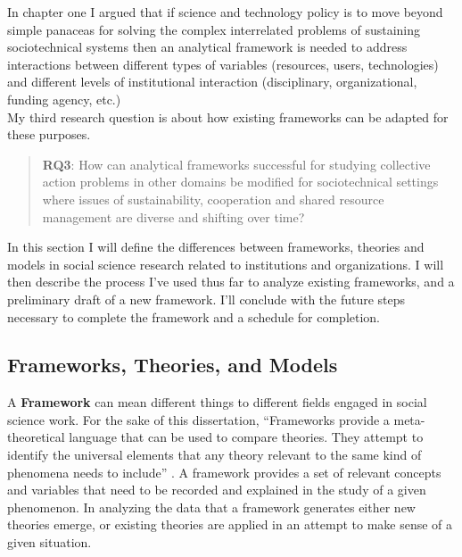 \documentclass[thesis,tocnosub,noragright,centerchapter,12pt]{uiucecethesis09}
\begin{document}
{In chapter one I argued that if science and
technology policy is to move beyond simple panaceas for solving the
complex interrelated problems of sustaining sociotechnical systems then
an analytical framework is needed to address interactions
between different types of variables (resources, users, technologies)
and different levels of institutional interaction (disciplinary,
organizational, funding agency, etc.)\\

My third research question is about how
existing frameworks can be adapted for these purposes.\\

\begin{quote}
\textbf{RQ3}: How can analytical frameworks successful for studying
collective action problems in other domains be modified for
sociotechnical settings where issues of sustainability, cooperation and
shared resource management are diverse and shifting over time?
\end{quote}

In this section I will define the differences between frameworks, theories and
models in social science research related to institutions and
organizations. I will then describe the process I've used thus far to analyze existing frameworks, and a preliminary draft of a new framework. I'll conclude with the future steps necessary to complete the framework and a schedule for completion.\\

\subsection*{Frameworks, Theories, and Models}

A \textbf{Framework} can mean different things to different fields engaged in
social science work. For the sake of this dissertation, ``Frameworks
provide a meta-theoretical language that can be used to compare
theories. They attempt to identify the universal elements that any
theory relevant to the same kind of phenomena needs to include''
\citep[p. 8]{ostrom2011background}. A framework provides a set of relevant concepts and variables that need to be recorded and explained in the study of a given phenomenon. In analyzing the data that a framework generates either new theories emerge, or existing theories are applied in an attempt to make sense of a given situation.\\

}
\end{document}
